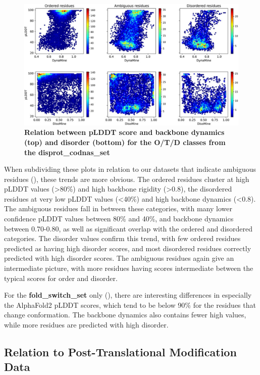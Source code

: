 \begin{figure}[tbh]
    \centering
    \includegraphics[width=\linewidth]{ambiguous//figures_ambiguous/fig6.pdf}
    \caption{\textbf{Relation between pLDDT score and backbone dynamics (top) and disorder (bottom) for the O/T/D classes from the disprot_codnas_set}}
    \label{fig:chapter5:fig6}
\end{figure}

When subdividing these plots in relation to our datasets that indicate ambiguous residues (), these trends are more obvious. The ordered residues cluster at high pLDDT values (>80\%) and high backbone rigidity (>0.8), the disordered residues at very low pLDDT values (<40\%) and high backbone dynamics (<0.8). The ambiguous residues fall in between these categories, with many lower confidence pLDDT values between 80\% and 40\%, and backbone dynamics between 0.70-0.80, as well as significant overlap with the ordered and disordered categories. The disorder values confirm this trend, with few ordered residues predicted as having high disorder scores, and most disordered residues correctly predicted with high disorder scores. The ambiguous residues again give an intermediate picture, with more residues having scores intermediate between the typical scores for order and disorder.

For the \textbf{fold_switch_set} only (), there are interesting differences in especially the AlphaFold2 pLDDT scores, which tend to be below 90\% for the residues that change conformation. The backbone dynamics also contains fewer high values, while more residues are predicted with high disorder.


\subsection{Relation to Post-Translational Modification Data}

